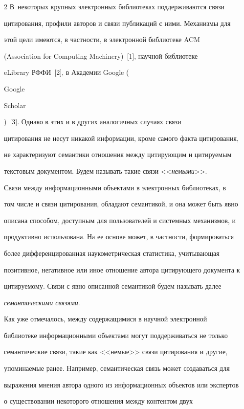 \begin{multicols}{2}
В~некоторых крупных электронных библиотеках поддерживаются связи 


цитирования, профили авторов и связи публикаций с ними. Механизмы для 


этой цели имеются, в частности, в электронной биб\-лио\-те\-ке {ACM} 


({Association for Computing Machinery})~[1], научной библиотеке 


{eLibrary} РФФИ~[2], в Академии {Google} ({Google 


Scholar})~[3]. Однако в этих и в других аналогичных случаях связи 


цитирования не несут никакой информации, кроме самого факта цитирования, 


не характеризуют семантики отношения между цитирующим и цитируемым 


текстовым документом. Будем называть такие связи <<\textit{немыми}>>.


  


  Связи между информационными объектами в электронных библиотеках, в 


том числе и связи цитирования, обладают семантикой, и она может быть явно 


описана способом, доступным для пользователей и системных механизмов, и 


продуктивно использована. На ее основе может, в частности, формироваться 


более дифференцированная нау\-ко\-мет\-ри\-че\-ская статистика, учитывающая 


позитивное, негативное или иное отношение автора цитирующего документа к 


цитируемому. Связи с явно описанной семантикой будем называть далее 


\textit{семантическими связями}. 


  


  Как уже отмечалось, между содержащимися в научной электронной 


библиотеке информационными объектами могут поддерживаться не только 


семантические связи, такие как <<немые>> связи цитирования и другие, 


упоминаемые ранее. Например, семантическая связь может создаваться для 


выражения мнения автора одного из информационных объектов или экспертов 


о существовании некоторого отношения между контентом двух 



\end{multicols}
